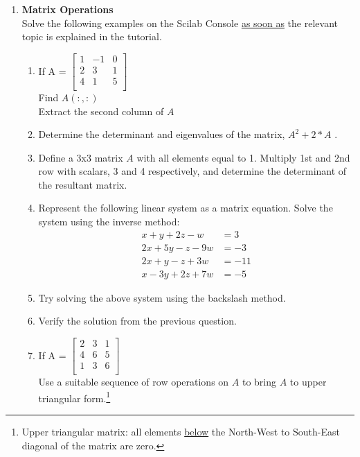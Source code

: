 \documentclass[12pt,a4paper]{article}
\renewcommand{\hl}[1]{#1}
\newenvironment{enumcpt}{\begin{enumerate} \topsep -3mm \partopsep -3mm 
                        \parsep -3mm
                        \itemsep -0mm \leftmargin -1in \rightmargin -3mm
                        }{\end{enumerate}}
\begin{document}
\begin{multicols}{2}
\begin{enumcpt}
\item {\bf Matrix Operations}\\Solve the following examples on the Scilab Console \underline {as soon as} the relevant topic is explained in the tutorial.
\begin{enumcpt}
\item If A = 
$\begin{bmatrix}
1 & -1 & 0\\
2 & 3 & 1\\
4 & 1 & 5\\
\end{bmatrix}$
\\
Find $A(:,:)$\\
Extract the second column of $A$
\item Determine the determinant and eigenvalues of the matrix, $A^2+2*A$ .
\item Define a 3x3 matrix $A$ with all elements equal to 1. Multiply 1st and 2nd row with scalars, 3 and 4 respectively, and determine the determinant of the resultant matrix.
\item Represent the following linear system as a matrix equation. Solve the system using the inverse method:
\begin{align*}
x+y+2z-w &= 3\\
2x+5y-z-9w &= -3\\
2x+y-z+3w &= -11\\
x-3y+2z+7w &= -5
\end{align*}
\item Try solving the above system using the backslash method. 
\item Verify the solution from the previous question. 
\item If A = 
$\begin{bmatrix}
2 & 3 & 1\\
4 & 6 & 5\\
1 & 3 & 6\\
\end{bmatrix}$
\\
Use a suitable sequence of row operations on $A$ to bring 
$A$ to upper triangular form.\footnote{Upper triangular matrix: all elements
\underline{below} the North-West to South-East diagonal of the matrix are zero.}  


\end{enumcpt}
\end{enumcpt}
\end{multicols}
\end{document}
